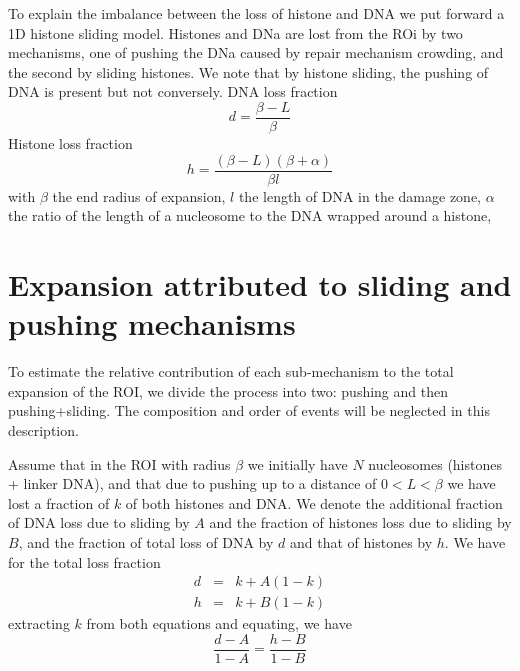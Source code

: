 \documentclass[12pt]{report}
\begin{document}
		To explain the imbalance between the loss of histone and DNA we put forward a 1D histone sliding model. Histones and DNa are lost from the ROi by two mechanisms, one of pushing the DNa caused by repair mechanism crowding, and the second by sliding histones. We note that by histone sliding, the pushing of DNA is present but not conversely.
		DNA loss fraction
		\begin{equation*}
        d=\frac{\beta-L}{\beta}
		\end{equation*}
		Histone loss fraction 
		\begin{equation*}
			h=\frac{(\beta -L)(\beta+\alpha)}{\beta l}
		\end{equation*}
		with $\beta$ the end radius of expansion, $l$ the length of DNA in the damage zone, $\alpha$ the ratio of the length of a nucleosome to the DNA wrapped around a histone, 
		
		\section{Expansion attributed to sliding and pushing mechanisms}
		To estimate the relative contribution of each sub-mechanism to the total expansion of the ROI, we divide the process into two: pushing and then pushing+sliding. The composition and order of events will be neglected in this description. 
		
		Assume that in the ROI with radius $\beta$ we initially have $N$ nucleosomes (histones + linker DNA), and that due to pushing up to a distance of $0<L<\beta$ we have lost a fraction of $k$ of both histones and DNA. We denote the additional fraction of DNA loss due to sliding by $A$ and the fraction of histones loss due to sliding by $B$, and the fraction of total loss of DNA by $d$ and that of histones by $h$. We have for the total loss fraction  
		\begin{eqnarray*}
			d &=& k+A(1-k) \\
			h &=& k+B(1-k)
		\end{eqnarray*}
		extracting $k$ from both equations and equating, we have 
		\begin{equation*}
		\frac{d-A}{1-A}=\frac{h-B}{1-B}
		\end{equation*}
		
\end{document}
